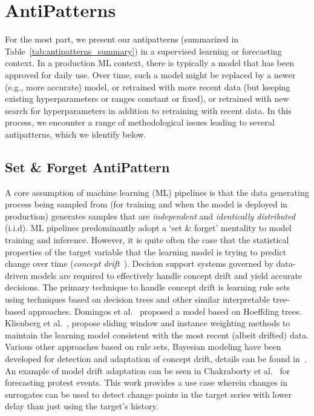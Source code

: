 \section{AntiPatterns}
For the most part, we present our antipatterns (summarized in Table~\ref{tab:antipatterns_summary}) in a supervised learning or forecasting context. In a production ML context, there is typically a model that has been approved for daily use. Over time, such a model might be replaced by a newer (e.g., more accurate) model, or retrained with more recent data (but keeping existing hyperparameters or ranges constant or fixed), or retrained with new search for hyperparameters in addition to retraining with recent data. %
In this process, we encounter a range of methodological issues leading to several antipatterns, which we identify below.







\subsection{Set \& Forget AntiPattern}\label{sec:concept_drift}
    A core assumption of machine learning (ML) pipelines is that the data generating process being sampled from (for training and when the model is deployed in production) generates samples that are \textit{independent} and \textit{identically distributed} (i.i.d). ML pipelines predominantly adopt a `set \& forget' mentality to model training and inference. However, it is quite often the case that the statistical properties of the target variable that the learning model is trying to predict change over time (\textit{concept drift}~\cite{widmer1996learning}). Decision support systems governed by data-driven models are required to effectively handle concept drift and yield accurate decisions. The primary technique to handle concept drift is learning rule sets using techniques based on decision trees and other similar interpretable tree-based approaches. Domingos et al.~\cite{domingos2000mining} proposed a model based on Hoeffding trees. Klienberg et al.~\cite{klinkenberg2004learning}, propose sliding window and instance weighting methods to maintain the learning model consistent with the most recent (albeit drifted) data. Various other approaches based on rule sets, Bayesian modeling have been developed for detection and adaptation of concept drift, details can be found in~\cite{gama2014survey,lu2018learning,webb2016characterizing}.
    An example of model drift adaptation can be seen in Chakraborty et al.~\cite{hqcd} for forecasting protest events. This work provides a use case wherein changes in surrogates can be used to detect change points in the target series with lower delay than just using the target's history.

